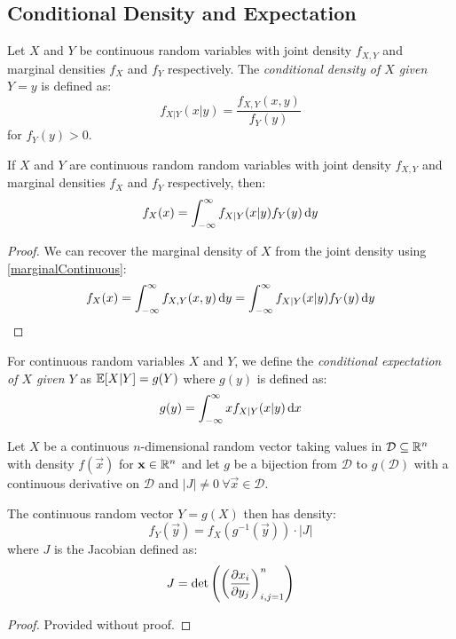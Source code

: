 \documentclass[../main.tex]{subfiles}
\begin{document}
\subsection{Conditional Density and Expectation}
\begin{definition}
  Let $X$ and $Y$ be continuous random variables with joint density $f_{X, Y}$ and marginal densities $f_{X}$ and $f_{Y}$ respectively.
  The \textit{conditional density of $X$ given $Y = y$} is defined as:
  \[
    f_{X \vert Y}(x \vert y) = \frac{f_{X, Y}(x, y)}{f_Y(y)}
  \]
  for $f_Y(y) > 0$.
\end{definition}
\begin{proposition}
  If $X$ and $Y$ are continuous random random variables with joint density $f_{X, Y}$ and marginal densities $f_{X}$ and $f_{Y}$ respectively, then:
  \[
    f_{X}(x) = \int_{-\infty}^{\infty} f_{X \vert Y}(x \vert y)f_Y(y) \d{y}
  \]
\end{proposition}
\begin{proof}
  We can recover the marginal density of $X$ from the joint density using \cref{marginalContinuous}:
  \[
    f_X(x) = \int_{-\infty}^{\infty} f_{X, Y}(x, y) \d{y} = \int_{-\infty}^{\infty} f_{X \vert Y}(x \vert y)f_Y(y) \d{y}
  \]
\end{proof}
\begin{definition}
  For continuous random variables $X$ and $Y$, we define the \textit{conditional expectation of $X$ given $Y$} as $\mathbb{E}[X \vert Y] = g(Y)$ where $g(y)$ is defined as:
  \[
    g(y) = \int_{-\infty}^{\infty} x f_{X \vert Y}(x \vert y) \d{x}
  \]
\end{definition}
\begin{theorem}
  Let $X$ be a continuous $n$-dimensional random vector taking values in $\mathcal{D} \subseteq \mathbb{R}^{n}$ with density $f(\vec{x})$ for $\mathbf{\bm{x}} \in \mathbb{R}^{n}$ and let $g$ be a bijection from $\mathcal{D}$ to $g(\mathcal{D})$ with a continuous derivative on $\mathcal{D}$ and $|J| \neq 0\ \forall \vec{x} \in \mathcal{D}$. \label{crvTransform}

  The continuous random vector $Y = g(X)$ then has density:
  \[
    f_Y(\vec{y}) = f_X(g^{-1}(\vec{y})) \cdot |J|
  \]
  where $J$ is the Jacobian defined as:
  \[
    J = \det \left(\left(\pderiv{x_i}{y_j}\right)_{i, j = 1}^n\right)
  \]
\end{theorem}
\begin{proof}
  Provided without proof.
\end{proof}
\end{document}
